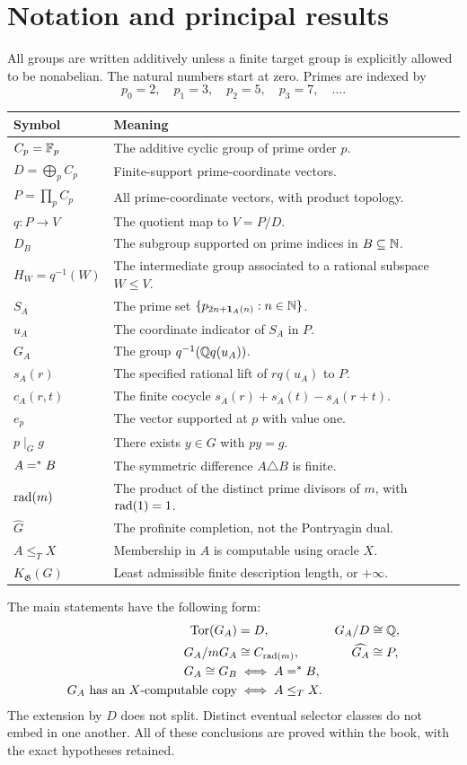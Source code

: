 \chapter*{Notation and principal results}
All groups are written additively unless a finite target group is explicitly allowed to be nonabelian. The natural numbers start at zero. Primes are indexed by
\[
p_0=2,\quad p_1=3,\quad p_2=5,\quad p_3=7,\quad\ldots.
\]
\begin{longtable}{@{}p{}p{}@{}}
\toprule
Symbol & Meaning\\\midrule
$C_p=\mathbb F_p$ & The additive cyclic group of prime order $p$.\\
$D=\bigoplus_p C_p$ & Finite-support prime-coordinate vectors.\\
$P=\prod_p C_p$ & All prime-coordinate vectors, with product topology.\\
$q:P\to V$ & The quotient map to $V=P/D$.\\
$D_B$ & The subgroup supported on prime indices in $B\subseteq\mathbb N$.\\
$H_W=q^{-1}(W)$ & The intermediate group associated to a rational subspace $W\le V$.\\
$S_A$ & The prime set $\{p_{2n+\mathbf 1_A(n)}:n\in\mathbb N\}$.\\
$u_A$ & The coordinate indicator of $S_A$ in $P$.\\
$G_A$ & The group $q^{-1}(\mathbb Q q(u_A))$.\\
$s_A(r)$ & The specified rational lift of $r q(u_A)$ to $P$.\\
$c_A(r,t)$ & The finite cocycle $s_A(r)+s_A(t)-s_A(r+t)$.\\
$e_p$ & The vector supported at $p$ with value one.\\
$p\mid_G g$ & There exists $y\in G$ with $py=g$.\\
$A=^{*} B$ & The symmetric difference $A\triangle B$ is finite.\\
$\operatorname{rad}(m)$ & The product of the distinct prime divisors of $m$, with $\operatorname{rad}(1)=1$.\\
$\widehat G$ & The profinite completion, not the Pontryagin dual.\\
$A\le_T X$ & Membership in $A$ is computable using oracle $X$.\\
$K_{\mathfrak G}(G)$ & Least admissible finite description length, or $+\infty$.\\
\bottomrule
\end{longtable}

\noindent The main statements have the following form:
\begin{align*}
\operatorname{Tor}(G_A)&=D,&G_A/D&\cong\mathbb Q,\\
G_A/mG_A&\cong C_{\operatorname{rad}(m)},&\widehat{G_A}&\cong P,\\
G_A\cong G_B&\iff A=^{*} B,&&\\
G_A\text{ has an }X\text{-computable copy}&\iff A\le_T X.&&
\end{align*}
The extension by $D$ does not split. Distinct eventual selector classes do not embed in one another. All of these conclusions are proved within the book, with the exact hypotheses retained.

